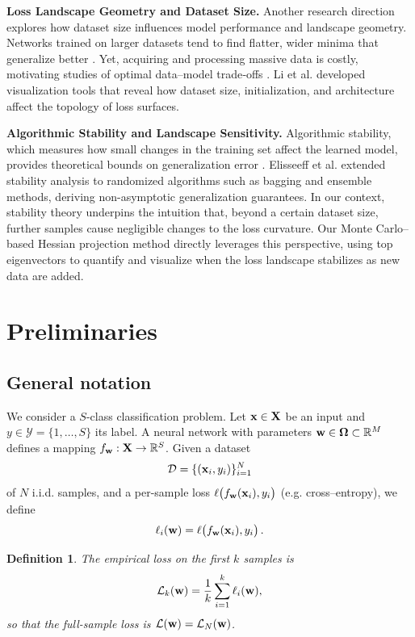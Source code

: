 \documentclass{article}
\newtheorem{definition}{Definition}
\begin{document}
\textbf{Loss Landscape Geometry and Dataset Size.}
Another research direction explores how dataset size influences model performance and landscape geometry. Networks trained on larger
datasets tend to find flatter, wider minima that generalize better \cite{wu2017towards}. Yet, acquiring and processing massive data is
costly, motivating studies of optimal data–model trade‑offs \cite{hoffmann2022training}. Li et al. \cite{li2018visualizing} developed
visualization tools that reveal how dataset size, initialization, and architecture affect the topology of loss surfaces.

\textbf{Algorithmic Stability and Landscape Sensitivity.}
Algorithmic stability, which measures how small changes in the training set affect the learned model, provides theoretical bounds on
generalization error \cite{bousquet2002stability}. Elisseeff et al. \cite{elisseeff2005stability} extended stability analysis to
randomized algorithms such as bagging and ensemble methods, deriving non-asymptotic generalization guarantees. In our context,
stability theory underpins the intuition that, beyond a certain dataset size, further samples cause negligible changes to the loss
curvature. Our Monte Carlo–based Hessian projection method directly leverages this perspective, using top eigenvectors to quantify
and visualize when the loss landscape stabilizes as new data are added.


\section{Preliminaries}\label{sec:prelim}

\subsection{General notation}

We consider a $S$-class classification problem. Let $\mathbf{x} \in \mathbf{X}$ be an input and $y \in \mathcal Y = \{1, \dots, S\}$ its label. A
neural network with parameters $\mathbf{w} \in \boldsymbol{\Omega} \subset \mathbb R^M$ defines a mapping $f_{\mathbf{w}} : \mathbf{X} \to \mathbb R^S$. Given a dataset
$$
  \mathcal D =
  \{(\mathbf{x}_i, y_i)\}_{i=1}^N
$$
of $N$ i.i.d. samples, and a per-sample loss $\ell \bigl( f_{\mathbf{w}}(\mathbf{x}_i), y_i \bigr)$ (e.g. cross–entropy), we define
$$
  \ell_i(\mathbf{w}) =
  \ell \bigl( f_{\mathbf{w}}(\mathbf{x}_i) , y_i \bigr)\,.
$$

\begin{definition}
  The empirical loss on the first $k$ samples is
  $$
    \mathcal{L}_k(\mathbf{w}) =
    \frac1k \sum_{i=1}^k \ell_i(\mathbf{w}),
  $$
  so that the full-sample loss is $\mathcal{L}(\mathbf{w}) = \mathcal{L}_N(\mathbf{w})$.
\end{definition}
\end{document}
